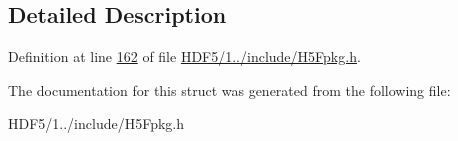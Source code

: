 \subsection{Detailed Description}


Definition at line \hyperlink{_h_d_f5_21_810_81_2include_2_h5_fpkg_8h_source_l00162}{162} of file \hyperlink{_h_d_f5_21_810_81_2include_2_h5_fpkg_8h_source}{H\+D\+F5/1../include/\+H5\+Fpkg.\+h}.



The documentation for this struct was generated from the following file\+:\begin{DoxyCompactItemize}
\item 
H\+D\+F5/1../include/\+H5\+Fpkg.\+h\end{DoxyCompactItemize}
